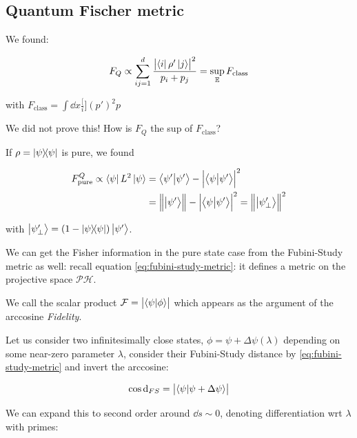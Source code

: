 \documentclass[main.tex]{subfiles}
\begin{document}
\subsection{Quantum Fischer metric}

We found:

\begin{equation}
F_Q \propto \sum_{ij=1}^d \frac{\abs{\bra{i}\rho'\ket{j}}^2}{p_i + p_j} = \sup_{\mathbb{E}} F_{\text{class}}
\end{equation}

with \(
F_{\text{class}} = \int \dd{x} \frac[i]{(p')^2}{p}
\)

\begin{greenbox}
  We did not prove this! How is \(F_Q\) the sup of \(F _{\text{class}} \)?
\end{greenbox}

If \(\rho = \dyad{\psi} \) is pure, we found

\begin{subequations}
\begin{align}
F^{Q}_{\text{pure}} \propto \bra{\psi} L^2 \ket{\psi} &= \braket{\psi'}{\psi'} - \abs{\braket{\psi}{\psi'}}^2 \\
&= \norm{\ket{\psi'}} -\abs{\braket{\psi}{\psi'}}^2
= \norm{\ket{\psi_\perp'}}^2
\end{align}
\end{subequations}

with \(\ket{\psi_\perp'}=(1-\ketbra{\psi})\ket{\psi'}\).

We can get the Fisher information in the pure state case from the Fubini-Study metric as well: recall equation \eqref{eq:fubini-study-metric}: it defines a metric on the projective space \(\mathcal{P} \mathcal{H}\).

We call the scalar product \(\mathcal{F}=\abs{\braket{\psi}{\phi}}\) which appears as the argument of the arccosine \emph{Fidelity}.

Let us consider two infinitesimally close states, \(\phi = \psi + \Delta\psi(\lambda)\) depending on some near-zero parameter \(\lambda\), consider their Fubini-Study distance by \eqref{eq:fubini-study-metric} and invert the arccosine:

\begin{equation}
\cos \dd_{FS} = \abs{\braket{\psi}{\psi+\Delta\psi}}
\end{equation}

We can expand this to second order around \(\dd{s} \sim 0\), denoting differentiation wrt  \(\lambda\) with primes:
\end{document}
